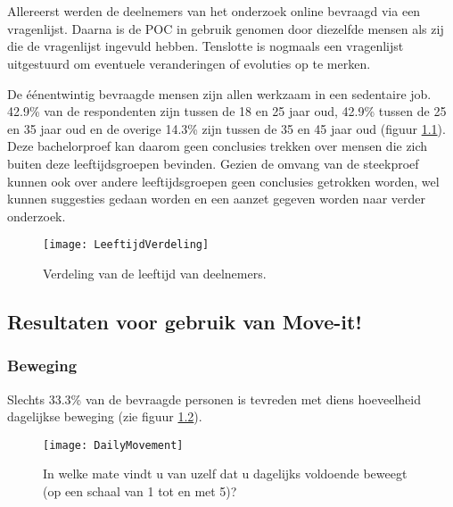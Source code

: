 \chapter{}%
\label{ch:analyse}

Allereerst werden de deelnemers van het onderzoek online bevraagd via een vragenlijst. Daarna is de POC in gebruik genomen door diezelfde mensen als zij die de vragenlijst ingevuld hebben. Tenslotte is nogmaals een vragenlijst uitgestuurd om eventuele veranderingen of evoluties op te merken.

De éénentwintig bevraagde mensen zijn allen werkzaam in een sedentaire job. 42.9\% van de respondenten zijn tussen de 18 en 25 jaar oud, 42.9\% tussen de 25 en 35 jaar oud en de overige 14.3\% zijn tussen de 35 en 45 jaar oud (figuur \ref{fig:leeftijd}). Deze bachelorproef kan daarom geen conclusies trekken over mensen die zich buiten deze leeftijdsgroepen bevinden. Gezien de omvang van de steekproef kunnen ook over andere leeftijdsgroepen geen conclusies getrokken worden, wel kunnen suggesties gedaan worden en een aanzet gegeven worden naar verder onderzoek.

\begin{figure}
    \caption[Verdeling van de leeftijd van deelnemers]{Verdeling van de leeftijd van deelnemers.}
    \texttt{[image: LeeftijdVerdeling]}
    \label{fig:leeftijd}
\end{figure}

\section{Resultaten voor gebruik van Move-it!}

\subsection{Beweging}
Slechts 33.3\% van de bevraagde personen is tevreden met diens hoeveelheid dagelijkse beweging (zie figuur \ref{fig:dagelijkseBeweging}).

\begin{figure}
    \caption[In welke mate vindt u van uzelf dat u dagelijks voldoende beweegt?]{In welke mate vindt u van uzelf dat u dagelijks voldoende beweegt (op een schaal van 1 tot en met 5)?}
    \texttt{[image: DailyMovement]}
    \label{fig:dagelijkseBeweging}
\end{figure}

